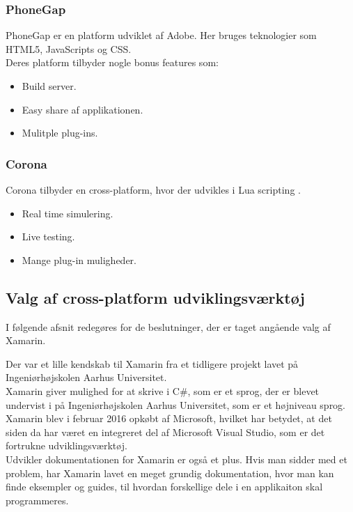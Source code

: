 \subsubsection{PhoneGap}
PhoneGap\cite{PhoneGap} er en platform udviklet af Adobe\cite{Adobe}. Her bruges teknologier som HTML5\cite{HTML5}, JavaScripts\cite{JavaScript} og CSS\cite{CSS}. \\
Deres platform tilbyder nogle bonus features som:
\begin{itemize}[-]
	\item Build server.
	\item Easy share af applikationen.
	\item Mulitple plug-ins.
\end{itemize}

\clearpage

\subsubsection{Corona}
Corona\cite{Corona} tilbyder en cross-platform, hvor der udvikles i Lua scripting \cite{Lua}.
\begin{itemize}[-]
	\item Real time simulering.
	\item Live testing.
	\item Mange plug-in muligheder.
\end{itemize}

\subsection{Valg af cross-platform udviklingsværktøj}
I følgende afsnit redegøres for de beslutninger, der er taget angående valg af Xamarin.

Der var et lille kendskab til Xamarin fra et tidligere projekt lavet på Ingeniørhøjskolen Aarhus Universitet. \\
Xamarin giver mulighed for at skrive i C\#, som er et sprog, der er blevet undervist i på Ingeniørhøjskolen Aarhus Universitet, som er et højniveau sprog. \\
Xamarin blev i februar 2016 opkøbt af Microsoft, hvilket har betydet, at det siden da har været en integreret del af Microsoft Visual Studio, som er det fortrukne udviklingsværktøj.\\
Udvikler dokumentationen for Xamarin er også et plus. Hvis man sidder med et problem, har Xamarin lavet en meget grundig dokumentation, hvor man kan finde eksempler og guides, til hvordan forskellige dele i en applikaiton skal programmeres.

